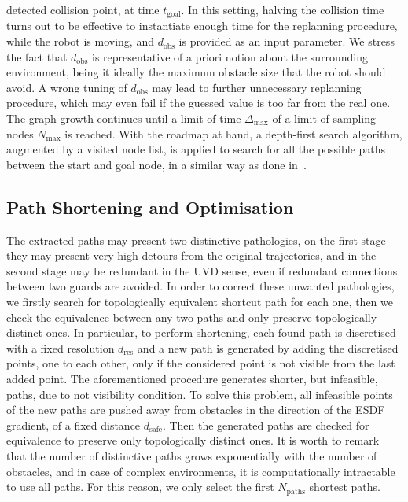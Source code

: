 detected collision point, at time $t_{\text{goal}}$. In this setting, halving the collision time turns out to be effective to
instantiate enough time for the replanning procedure, while the robot is moving, and $d_{\text{obs}}$ is provided as an input
parameter. We stress the fact that $d_{\text{obs}}$ is representative of a priori notion about the surrounding environment,
being it ideally the maximum obstacle size that the robot should avoid. A wrong tuning of $d_{\text{obs}}$ may lead to further
unnecessary replanning procedure, which may even fail if the guessed value is too far from the real one. The graph growth continues
until a limit of time $\Delta_{\text{max}}$ of a limit of sampling nodes $N_{\text{max}}$ is reached. With the roadmap at hand,
a depth-first search algorithm, augmented by a visited node list, is applied to search for all the possible paths between the
start and goal node, in a similar way as done in~\cite{rosmann2017integrated}.

\subsection{Path Shortening and Optimisation}%
\label{SEC:REPLANNING-OPTIMISATION}
The extracted paths may present two distinctive pathologies, on the first stage they may present very high detours from the original trajectories,
and in the second stage may be redundant in the UVD sense, even if redundant connections between two guards are avoided.
In order to correct these unwanted pathologies, we firstly search for topologically equivalent shortcut path for each one, then
we check the equivalence between any two paths and only preserve topologically distinct ones.
In particular, to perform shortening, each found path is discretised with a fixed resolution $d_{\text{res}}$ and a new path
is generated by adding the discretised points, one to each other, only if the considered point is not visible from the last added point.
The aforementioned procedure generates shorter, but infeasible, paths, due to not visibility condition.
To solve this problem, all infeasible points of the new paths are pushed away from obstacles in the direction of the ESDF gradient, of
a fixed distance $d_{\text{safe}}$. Then the generated paths are checked for equivalence to preserve only topologically distinct ones.
It is worth to remark that the number of distinctive paths grows exponentially with the number of obstacles, and in case of complex environments,
it is computationally intractable to use all paths. For this reason, we only select the first $N_{\text{paths}}$ shortest paths.

